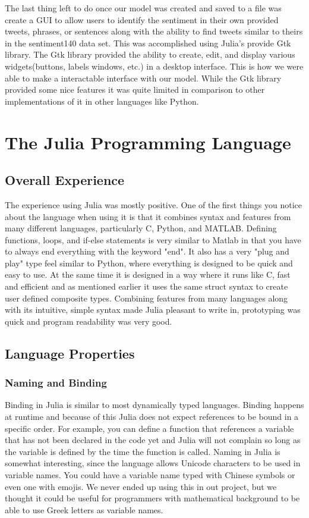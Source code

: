 \documentclass{article}
\begin{document}
The last thing left to do once our model was created and saved to a file was create a GUI to allow users to identify the sentiment in their own provided tweets, phrases, or sentences along with the ability to find tweets similar to theirs in the sentiment140 data set. This was accomplished using Julia's provide Gtk library. The Gtk library provided the ability to create, edit, and display various widgets(buttons, labels windows, etc.) in a desktop interface. This is how we were able to make a interactable interface with our model. While the Gtk library provided some nice features it was quite limited in comparison to other implementations of it in other languages like Python.

\section{The Julia Programming Language}
\subsection{Overall Experience}
The experience using Julia was mostly positive. One of the first things you notice about the language when using it is that it combines syntax and features from many different languages, particularly C, Python, and MATLAB. Defining functions, loops, and if-else statements is very similar to Matlab in that you have to always end everything with the keyword "end". It also has a very "plug and play" type feel similar to Python, where everything is designed to be quick and easy to use. At the same time it is designed in a way where it runs like C, fast and efficient and as mentioned earlier it uses the same struct syntax to create user defined composite types. Combining features from many languages along with its intuitive, simple syntax made Julia pleasant to write in, prototyping was quick and program readability was very good.

\subsection{Language Properties}
\subsubsection{Naming and Binding}
Binding in Julia is similar to most dynamically typed languages. Binding happens at runtime and because of this Julia does not expect references to be bound in a specific order. For example, you can define a function that references a variable that has not been declared in the code yet and Julia will not complain so long as the variable is defined by the time the function is called. Naming in Julia is somewhat interesting, since the language allows Unicode characters to be used in variable names. You could have a variable name typed with Chinese symbols or even one with emojis. We never ended up using this in out project, but we thought it could be useful for programmers with mathematical background to be able to use Greek letters as variable names.
\end{document}
